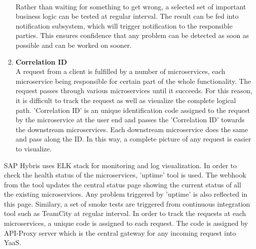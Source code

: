 \begin{enumerate}
\\
Rather than waiting for something to get wrong, a selected set of important business logic can be tested at regular interval. The result can be fed into notification subsystem, which will trigger notification to the responsible parties. This ensures confidence that any problem can be detected as soon as possible and can be worked on sooner. \cite{Simone:2014aa} \cite{Newman:2015aa}
\item \textbf{Correlation ID} \\
A request from a client is fulfilled by a number of microservices, each microservice being responsible for certain part of the whole functionality. The request passes through various microservices until it succeeds. For this reason, it is difficult to track the request as well as visualize the complete logical path. 'Correlation ID' is an unique identification code assigned to the request by the microservice at the user end and passes the 'Correlation ID' towards the downstream microservices. Each downstream microservice does the same and pass along the ID. In this way, a complete picture of any request is easier to visualize.
\end{enumerate}
\begin{shaded}
SAP Hybris uses ELK stack for monitoring and log visualization. In order to check the health status of the microservices, 'uptime' tool is used. The webhook from the tool updates the central status page showing the current status of all the existing microservices. Any problem triggered by 'uptime' is also reflected in this page. Similary, a set of smoke tests are triggered from continuous integration tool such as TeamCity at regular interval. In order to track the requests at each microservices, a unique code is assigned to each request. The code is assigned by API-Proxy server which is the central gateway for any incoming request into \acrshort{YaaS}.
\end{shaded}

